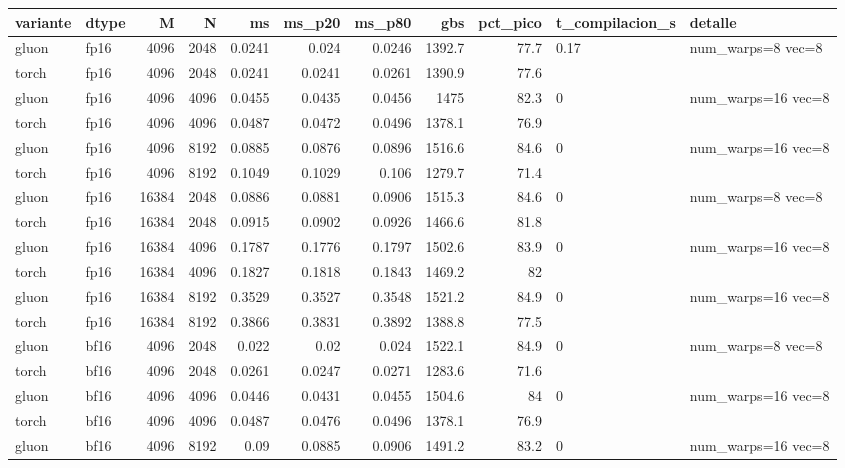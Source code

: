 \begin{table}[htbp]
  \centering\small
  \begin{tabular}{llrrrrrrrll}
    \toprule
    variante & dtype & M & N & ms & ms\_p20 & ms\_p80 & gbs & pct\_pico & t\_compilacion\_s & detalle \\
    \midrule
    gluon & fp16 & 4096 & 2048 & 0.0241 & 0.024 & 0.0246 & 1392.7 & 77.7 & 0.17 & num\_warps=8 vec=8 \\
    torch & fp16 & 4096 & 2048 & 0.0241 & 0.0241 & 0.0261 & 1390.9 & 77.6 &  &  \\
    gluon & fp16 & 4096 & 4096 & 0.0455 & 0.0435 & 0.0456 & 1475 & 82.3 & 0 & num\_warps=16 vec=8 \\
    torch & fp16 & 4096 & 4096 & 0.0487 & 0.0472 & 0.0496 & 1378.1 & 76.9 &  &  \\
    gluon & fp16 & 4096 & 8192 & 0.0885 & 0.0876 & 0.0896 & 1516.6 & 84.6 & 0 & num\_warps=16 vec=8 \\
    torch & fp16 & 4096 & 8192 & 0.1049 & 0.1029 & 0.106 & 1279.7 & 71.4 &  &  \\
    gluon & fp16 & 16384 & 2048 & 0.0886 & 0.0881 & 0.0906 & 1515.3 & 84.6 & 0 & num\_warps=8 vec=8 \\
    torch & fp16 & 16384 & 2048 & 0.0915 & 0.0902 & 0.0926 & 1466.6 & 81.8 &  &  \\
    gluon & fp16 & 16384 & 4096 & 0.1787 & 0.1776 & 0.1797 & 1502.6 & 83.9 & 0 & num\_warps=16 vec=8 \\
    torch & fp16 & 16384 & 4096 & 0.1827 & 0.1818 & 0.1843 & 1469.2 & 82 &  &  \\
    gluon & fp16 & 16384 & 8192 & 0.3529 & 0.3527 & 0.3548 & 1521.2 & 84.9 & 0 & num\_warps=16 vec=8 \\
    torch & fp16 & 16384 & 8192 & 0.3866 & 0.3831 & 0.3892 & 1388.8 & 77.5 &  &  \\
    gluon & bf16 & 4096 & 2048 & 0.022 & 0.02 & 0.024 & 1522.1 & 84.9 & 0 & num\_warps=8 vec=8 \\
    torch & bf16 & 4096 & 2048 & 0.0261 & 0.0247 & 0.0271 & 1283.6 & 71.6 &  &  \\
    gluon & bf16 & 4096 & 4096 & 0.0446 & 0.0431 & 0.0455 & 1504.6 & 84 & 0 & num\_warps=16 vec=8 \\
    torch & bf16 & 4096 & 4096 & 0.0487 & 0.0476 & 0.0496 & 1378.1 & 76.9 &  &  \\
    gluon & bf16 & 4096 & 8192 & 0.09 & 0.0885 & 0.0906 & 1491.2 & 83.2 & 0 & num\_warps=16 vec=8 \\

\end{tabular}
\end{table}
